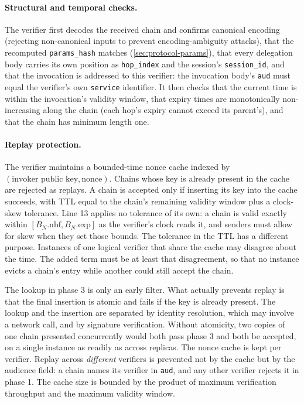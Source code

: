 \documentclass[11pt,a4paper]{article}
\begin{document}
\paragraph{Structural and temporal checks.}
The verifier first decodes the received chain and confirms canonical
encoding (rejecting non-canonical inputs to prevent encoding-ambiguity
attacks), that the recomputed \texttt{params\_hash} matches
(\cref{sec:protocol-params}), that every delegation body carries its own
position as \texttt{hop\_index} and the session's
\texttt{session\_id}, and that the invocation is addressed to this verifier: the
invocation body's \texttt{aud} must equal the verifier's own
\texttt{service} identifier. It then checks that the current time is within the
invocation's validity window, that expiry times are monotonically
non-increasing along the chain (each hop's expiry cannot exceed its
parent's), and that the chain has minimum length one.

\paragraph{Replay protection.}
The verifier maintains a bounded-time nonce cache indexed by
$(\text{invoker public key}, \text{nonce})$. Chains whose key is
already present in the cache are rejected as replays. A chain is
accepted only if inserting its key into the cache succeeds, with TTL
equal to the chain's remaining validity window plus a clock-skew
tolerance. Line 13 applies no tolerance of its own: a chain is valid
exactly within $[B_N.\text{nbf}, B_N.\text{exp}]$ as the verifier's
clock reads it, and senders must allow for skew when they set those
bounds. The tolerance in the TTL has a different purpose. Instances of
one logical verifier that share the cache may disagree about the time.
The added term must be at least that disagreement, so that no instance
evicts a chain's entry while another could still accept the chain.

The lookup in phase 3 is only an early filter. What actually prevents
replay is that the final insertion is atomic and fails if the key is
already present. The lookup and the insertion are separated by identity
resolution, which may involve a network call, and by signature
verification. Without atomicity, two copies of one chain presented
concurrently would both pass phase 3 and both be accepted, on a single
instance as readily as across replicas. The nonce cache is kept per
verifier. Replay across \emph{different} verifiers is prevented not by
the cache but by the audience field: a chain names its verifier in
\texttt{aud}, and any other verifier rejects it in phase 1. The cache size
is bounded by the product of maximum verification throughput and the
maximum validity window.
\end{document}
